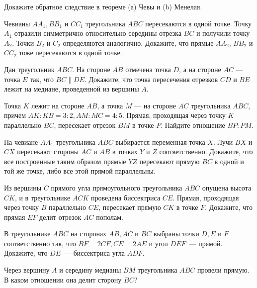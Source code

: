 \documentclass{article}
\begin{document}
    \begin{enumerate_boxed}
        \setcounter{enumi}{3}

        \item Докажите обратное следствие в теореме (а) Чевы и (b) Менелая.

        \item Чевианы $AA_1, BB_1$ и $CC_1$ треугольника $ABC$ пересекаются в одной точке.
        Точку $A_1$ отразили симметрично относительно середины отрезка $BC$ и получили точку $A_2$.
        Точки $B_2$ и $C_2$ определяются аналогично.
        Докажите, что прямые $AA_2$, $BB_2$ и $CC_2$ тоже пересекаются в одной точке.

        \item Дан треугольник $ABC$.
        На стороне $AB$ отмечена точка $D$, а на стороне $AC$ — точка $E$ так, что $BC \parallel DE$.
        Докажите, что точка пересечения отрезков $CD$ и $BE$ лежит на медиане, проведенной из вершины $A$.

        \item Точка $K$ лежит на стороне $AB$, а точка $M$ — на стороне $AC$ треугольника $ABC$, причем $AK : KB = 3 : 2, AM : MC = 4 : 5$.
        Прямая, проходящая через точку $K$ параллельно $BC$, пересекает отрезок $BM$ в точке $P$.
        Найдите отношение $BP : PM$.

        \item На чевиане $AA_1$ треугольника $ABC$ выбирается переменная точка $X$.
        Лучи $BX$ и $CX$ пересекают стороны $AC$ и $AB$ в точках $Y$ и $Z$ соответственно.
        Докажите, что все построенные таким образом прямые $YZ$ пересекают прямую $BC$ в одной и той же точке, либо все этой прямой параллельны.

        \item Из вершины $C$ прямого угла прямоугольного треугольника $ABC$ опущена высота $CK$, и в треугольнике $ACK$ проведена биссектриса $CE$.
        Прямая, проходящая через точку $B$ параллельно $CE$, пересекает прямую $CK$ в точке $F$.
        Докажите, что прямая $EF$ делит отрезок $AC$ пополам.

        \item В треугольнике $ABC$ на сторонах $AB,AC$ и $BC$ выбраны точки $D,E$ и $F$ соответственно так, что $BF = 2CF, CE = 2AE$ и угол $DEF$~--- прямой.
        Докажите, что $DE$~--- биссектриса угла $ADF$.

        \item Через вершину $A$ и середину медианы $BM$ треугольника $ABC$ провели прямую.
        В каком отношении она делит сторону $BC$?


\end{enumerate_boxed}
\end{document}
